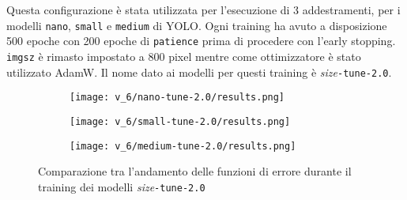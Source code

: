 Questa configurazione è stata utilizzata per l'esecuzione di 3 addestramenti, per i modelli
\texttt{nano}, \texttt{small} e \texttt{medium} di YOLO. Ogni training ha avuto a disposizione
500 epoche con 200 epoche di \texttt{patience} prima di procedere con l'early stopping. 
\texttt{imgsz} è rimasto impostato a 800 pixel mentre come ottimizzatore è stato utilizzato AdamW.
Il nome dato ai modelli per questi training è \textit{size}\texttt{-tune-2.0}.

\begin{figure}[!htb]
    \centering
    \begin{subfigure}{.8\textwidth}
        \texttt{[image: v\_6/nano-tune-2.0/results.png]}
        \label{fig:v6-3.1}
    \end{subfigure}
    \begin{subfigure}{.8\textwidth}
        \texttt{[image: v\_6/small-tune-2.0/results.png]}
        \label{fig:v6-3.2}
    \end{subfigure}
    \begin{subfigure}{.8\textwidth}
        \texttt{[image: v\_6/medium-tune-2.0/results.png]}
        \label{fig:v6-3.3}
    \end{subfigure}
    \caption{Comparazione tra l'andamento delle funzioni di errore durante il training
    dei modelli \textit{size}\texttt{-tune-2.0}}
    \label{fig:v6-3}
\end{figure}

